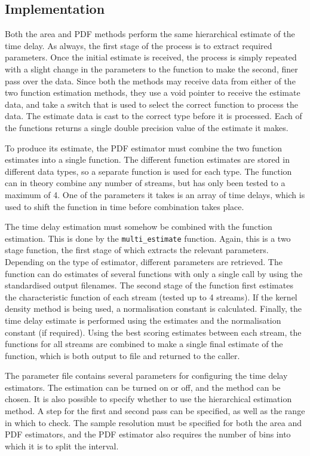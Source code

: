 \documentclass[a4paper,11pt]{article}
\begin{document}
\subsection{Implementation}
\label{sec-7-3}

   Both the area and PDF methods perform the same hierarchical estimate of the
   time delay. As always, the first stage of the process is to extract required
   parameters. Once the initial estimate is received, the process is simply
   repeated with a slight change in the parameters to the function to make the
   second, finer pass over the data. Since both the methods may receive data
   from either of the two function estimation methods, they use a void pointer
   to receive the estimate data, and take a switch that is used to select the
   correct function to process the data. The estimate data is cast to the
   correct type before it is processed. Each of the functions returns a single
   double precision value of the estimate it makes.

   To produce its estimate, the PDF estimator must combine the two function
   estimates into a single function. The different function estimates are stored
   in different data types, so a separate function is used for each
   type. The function can in theory combine any number of streams, but has only
   been tested to a maximum of 4. One of the parameters it takes is an array of
   time delays, which is used to shift the function in time before combination
   takes place. 

   The time delay estimation must somehow be combined with the function
   estimation. This is done by the \texttt{multi\_estimate} function. Again, this
   is a two stage function, the first stage of which extracts the relevant
   parameters. Depending on the type of estimator, different parameters are
   retrieved. The function can do estimates of several functions with only a
   single call by using the standardised output filenames. The second stage of
   the function first estimates the characteristic function of each stream
   (tested up to 4 streams). If the kernel density method is being used, a
   normalisation constant is calculated. Finally, the time delay estimate is
   performed using the estimates and the normalisation constant (if
   required). Using the best scoring estimates between each stream, the
   functions for all streams are combined to make a single final estimate of the
   function, which is both output to file and returned to the caller.

   The parameter file contains several parameters for configuring the time delay
   estimators. The estimation can be turned on or off, and the method can be
   chosen. It is also possible to specify whether to use the hierarchical
   estimation method. A step for the first and second pass can be specified, as
   well as the range in which to check. The sample resolution must be specified
   for both the area and PDF estimators, and the PDF estimator also requires the
   number of bins into which it is to split the interval.
\end{document}

